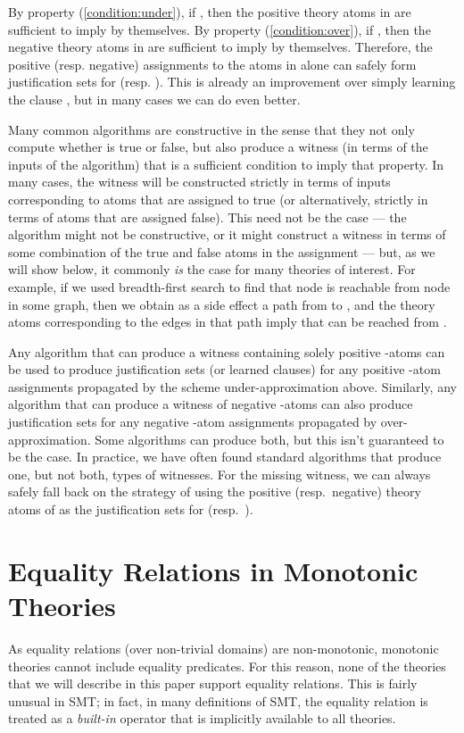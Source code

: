 \documentclass[runningheads]{llncs}
\begin{document}
By property
(\ref{condition:under}), if , then the
positive theory atoms in  are sufficient to imply  by themselves.
By property (\ref{condition:over}), if , then the
negative theory atoms in  are sufficient to imply  by
themselves. Therefore, the positive (resp. negative) assignments to the atoms in  alone
can safely form justification sets for  (resp. ).
This is already an improvement over simply learning the clause ,
but in many cases we can do even better.

Many common algorithms are constructive in the sense that they not only
compute whether  is true or false, but also produce a witness (in terms
of the inputs of the algorithm) that is a sufficient condition to imply
that property. In many cases, the witness will be constructed strictly
in terms of inputs corresponding to atoms that are assigned to true (or
alternatively, strictly in terms of atoms that are assigned false). This
need not be the case --- the algorithm might not be constructive,
or it might construct a witness in terms of some combination of the
true and false atoms in the assignment --- but, as we will show below,
it commonly \textit{is} the case for many theories of interest.  For example,
if we used breadth-first search to find that node  is reachable
from node  in some graph,
then we obtain as a side effect a path from 
to , and the theory atoms corresponding to the edges in that path
imply that  can be reached from .

Any algorithm that can produce a witness containing solely
positive -atoms can be used to produce justification sets
(or learned clauses) for any positive -atom assignments propagated
by the scheme under-approximation above. Similarly, any algorithm that
can produce a witness of negative -atoms can also produce
justification sets for any negative -atom assignments propagated by
over-approximation.
Some algorithms can produce both, but this isn't guaranteed to be the case.
In practice, we have often found standard algorithms that produce
one, but not both, types of witnesses.
For the missing witness, we can always safely fall back on the
strategy of using the positive (resp.~negative) theory atoms of 
as the justification sets for  (resp.~).

\section{Equality Relations in Monotonic Theories\label{sec:equality}}

As equality relations (over non-trivial domains) are non-monotonic, monotonic theories cannot include equality predicates.
For this reason, none of the theories that we will describe in this paper support equality relations. This is fairly unusual in SMT; in fact, in many definitions of SMT\cite{sebastiani2007lazy,de2009satisfiability}, the equality relation is treated as a \textit{built-in} operator that is implicitly available to all theories.
\end{document}
